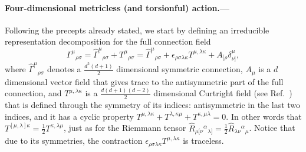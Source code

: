 \documentclass[twocolumn,aps,showpacs,showkeys,prl,superscriptaddress]{revtex4-1}
\begin{document}


\paragraph{\label{sec:4}Four-dimensional metricless (and torsionful) action.---}
Following the precepts  already stated, we start  by defining an irreducible representation decomposition for the full connection field 
\begin{equation}
  \Gamma^\mu{}_{\rho\sigma} = \hat{\Gamma}^\mu{}_{\rho\sigma} + T^\mu{}_{\rho\sigma} = \hat{\Gamma}^\mu{}_{\rho\sigma} + \epsilon_{\rho\sigma\lambda\kappa}T^{\mu,\lambda\kappa}+A_{[\rho}\delta^\mu_{\nu]},
\end{equation}
where $\hat{\Gamma}^\mu{}_{\rho\sigma}$ denotes a $\tfrac{d^2(d+1)}{2}$ dimensional symmetric connection, $A_\mu$ is a $d$ dimensional vector field  that gives trace to the antisymmetric part of the full connection, and  $T^{\mu,\lambda\kappa}$ is a $\tfrac{d(d+1)(d-2)}{2}$ dimensional Curtright field (see Ref.~\cite{Curtright:1980yk}) that is defined through the symmetry of its indices: antisymmetric in the last two indices, and it has a cyclic property $T^{\mu,\lambda\kappa}+T^{\lambda,\kappa\mu}+T^{\kappa,\mu\lambda}=0$. In other words that $T^{[\mu,\lambda]\kappa}=\frac{1}{2}T^{\kappa,\lambda\mu}$, just as for  the Riemmann tensor $\hat{R}_{\mu[\nu}{}^\alpha{}_{\lambda]}=\frac{1}{2}\hat{R}_{\lambda\nu}{}^\alpha{}_{\mu}$. Notice that due to its symmetries, the contraction $\epsilon_{\rho\sigma\lambda\kappa}T^{\mu,\lambda\kappa}$ is traceless.
\end{document}
